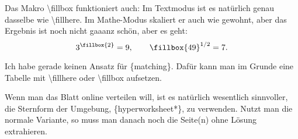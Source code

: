 \documentclass[hyperworksheet]{drcschool}
\newcommand*{\cs}[1]{\textup{\ttfamily\textbackslash#1}}                   %
\newcommand*{\env}[1]{\textup{\ttfamily\{#1\}}}                            %
\begin{document}
\begin{hyperworksheet}

Das Makro \cs{fillbox} funktioniert auch: Im Textmodus ist es natürlich genau dasselbe
wie \cs{fillhere}. Im Mathe-Modus skaliert er auch wie gewohnt, aber das Ergebnis ist
noch nicht gaaanz schön, aber es geht:
\[
3^{\fillbox{2}} = 9, \qquad \fillbox{49}^{1/2}=7 .
\]

\hard\exercise[Schlussbemerkung]
Ich habe gerade keinen Ansatz für \env{matching}. Dafür kann man im Grunde eine Tabelle
mit \cs{fillhere} oder \cs{fillbox} aufsetzen.

Wenn man das Blatt online verteilen will, ist es natürlich wesentlich sinnvoller,
die Sternform der Umgebung, \env{hyperworksheet*}, zu verwenden. Nutzt man die normale
Variante, so muss man danach noch die Seite(n) ohne Lösung extrahieren.
\end{hyperworksheet}
\end{document}
